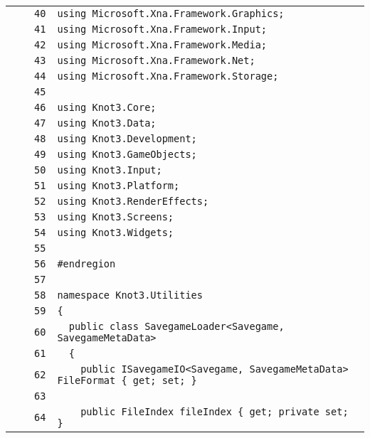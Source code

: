 \documentclass[a4paper,10pt]{article}
\begin{document}
\begin{longtable}[l]{lrrl}
\cellcolor{gray} &  & \verb~40~ & \verb~using Microsoft.Xna.Framework.Graphics;~\\
\cellcolor{gray} &  & \verb~41~ & \verb~using Microsoft.Xna.Framework.Input;~\\
\cellcolor{gray} &  & \verb~42~ & \verb~using Microsoft.Xna.Framework.Media;~\\
\cellcolor{gray} &  & \verb~43~ & \verb~using Microsoft.Xna.Framework.Net;~\\
\cellcolor{gray} &  & \verb~44~ & \verb~using Microsoft.Xna.Framework.Storage;~\\
\cellcolor{gray} &  & \verb~45~ & \verb~~\\
\cellcolor{gray} &  & \verb~46~ & \verb~using Knot3.Core;~\\
\cellcolor{gray} &  & \verb~47~ & \verb~using Knot3.Data;~\\
\cellcolor{gray} &  & \verb~48~ & \verb~using Knot3.Development;~\\
\cellcolor{gray} &  & \verb~49~ & \verb~using Knot3.GameObjects;~\\
\cellcolor{gray} &  & \verb~50~ & \verb~using Knot3.Input;~\\
\cellcolor{gray} &  & \verb~51~ & \verb~using Knot3.Platform;~\\
\cellcolor{gray} &  & \verb~52~ & \verb~using Knot3.RenderEffects;~\\
\cellcolor{gray} &  & \verb~53~ & \verb~using Knot3.Screens;~\\
\cellcolor{gray} &  & \verb~54~ & \verb~using Knot3.Widgets;~\\
\cellcolor{gray} &  & \verb~55~ & \verb~~\\
\cellcolor{gray} &  & \verb~56~ & \verb~#endregion~\\
\cellcolor{gray} &  & \verb~57~ & \verb~~\\
\cellcolor{gray} &  & \verb~58~ & \verb~namespace Knot3.Utilities~\\
\cellcolor{gray} &  & \verb~59~ & \verb~{~\\
\cellcolor{gray} &  & \verb~60~ & \verb~  public class SavegameLoader<Savegame, SavegameMetaData>~\\
\cellcolor{gray} &  & \verb~61~ & \verb~  {~\\
\cellcolor{gray} &  & \verb~62~ & \verb~    public ISavegameIO<Savegame, SavegameMetaData> FileFormat { get; set; }~\\
\cellcolor{gray} &  & \verb~63~ & \verb~~\\
\cellcolor{gray} &  & \verb~64~ & \verb~    public FileIndex fileIndex { get; private set; }~\\

\end{longtable}
\end{document}
